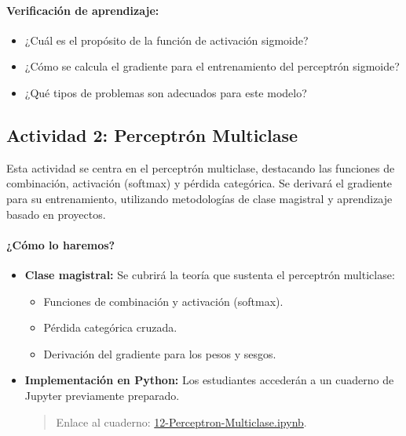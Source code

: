 \documentclass[a4,11pt]{aleph-notas}
\begin{document}
\paragraph{Verificación de aprendizaje:}  
\begin{itemize}[leftmargin=*]
    \item ¿Cuál es el propósito de la función de activación sigmoide?
    \item ¿Cómo se calcula el gradiente para el entrenamiento del perceptrón sigmoide?
    \item ¿Qué tipos de problemas son adecuados para este modelo?
\end{itemize}

\subsection*{Actividad 2: Perceptrón Multiclase}

Esta actividad se centra en el perceptrón multiclase, destacando las funciones de combinación, activación (softmax) y pérdida categórica. Se derivará el gradiente para su entrenamiento, utilizando metodologías de clase magistral y aprendizaje basado en proyectos.

\paragraph{¿Cómo lo haremos?}  
\begin{itemize}[leftmargin=*]
    \item \textbf{Clase magistral:} Se cubrirá la teoría que sustenta el perceptrón multiclase:
    \begin{itemize}
        \item Funciones de combinación y activación (softmax).
        \item Pérdida categórica cruzada.
        \item Derivación del gradiente para los pesos y sesgos.
    \end{itemize}
    \item \textbf{Implementación en Python:} Los estudiantes accederán a un cuaderno de Jupyter previamente preparado.
    \begin{quote}
        Enlace al cuaderno: \href{https://colab.research.google.com/github/andres-merino/AprendizajeAutomaticoInicial-05-N0105/blob/main/2-Notebooks/13-Perceptron-Multiclase.ipynb}{12-Perceptron-Multiclase.ipynb}.
    \end{quote}
\end{itemize}
\end{document}
